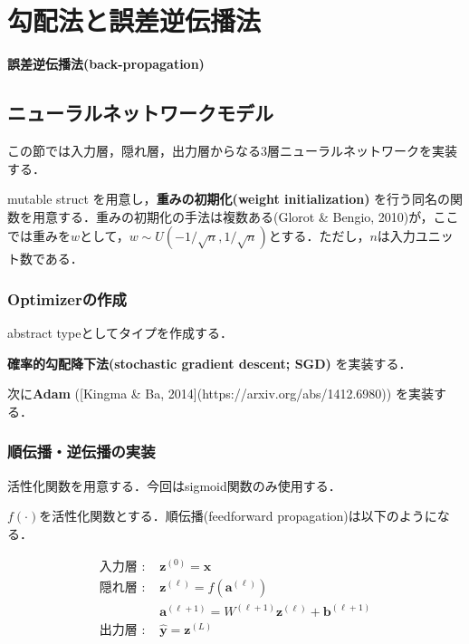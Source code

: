\section{勾配法と誤差逆伝播法}
\textbf{誤差逆伝播法(back-propagation)}
\subsection{ニューラルネットワークモデル}
この節では入力層，隠れ層，出力層からなる3層ニューラルネットワークを実装する．


mutable struct を用意し，\textbf{重みの初期化(weight initialization)} を行う同名の関数を用意する．重みの初期化の手法は複数ある(Glorot & Bengio, 2010)が，ここでは重みを$w$として，$w \sim U\left(-1/\sqrt{n}, 1/\sqrt{n}\right)$とする．ただし，$n$は入力ユニット数である．
\subsubsection{Optimizerの作成}
abstract typeとしてタイプを作成する．

\textbf{確率的勾配降下法(stochastic gradient descent; SGD)} を実装する．

次に\textbf{Adam} ([Kingma & Ba, 2014](https://arxiv.org/abs/1412.6980)) を実装する．

\subsubsection{順伝播・逆伝播の実装}
活性化関数を用意する．今回はsigmoid関数のみ使用する．

$f(\cdot)$を活性化関数とする．順伝播(feedforward propagation)は以下のようになる．


\begin{align}
\text{入力層 : }&\mathbf{z}^{(0)}=\mathbf{x}\\
\text{隠れ層 : }&\mathbf{z}^{(\ell)}=f\left(\mathbf{a}^{(\ell)}\right)\\
&\mathbf{a}^{(\ell+1)}=W^{(\ell+1)}\mathbf{z}^{(\ell)}+\mathbf{b}^{(\ell+1)}\\
\text{出力層 : }&\hat{\mathbf{y}}=\mathbf{z}^{(L)}
\end{align}


